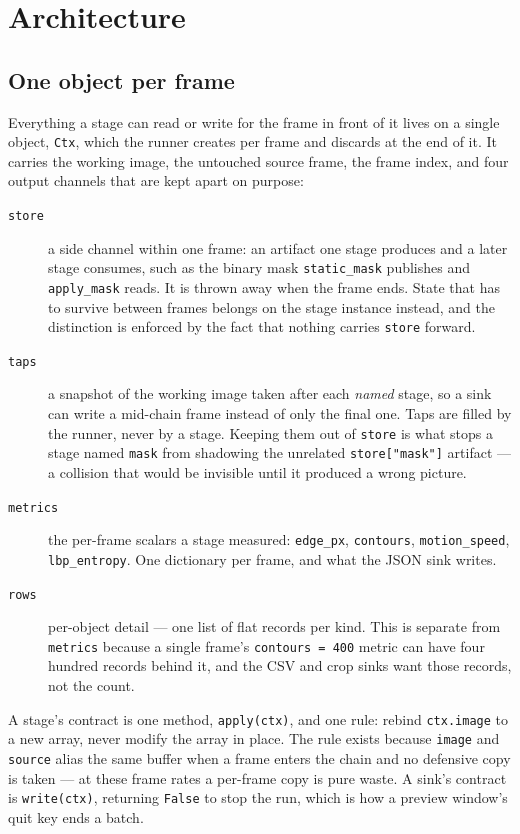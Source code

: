 \section{Architecture}
\label{sec:architecture}

\subsection{One object per frame}

Everything a stage can read or write for the frame in front of it lives on a
single object, \texttt{Ctx}, which the runner creates per frame and discards at
the end of it. It carries the working image, the untouched source frame, the
frame index, and four output channels that are kept apart on purpose:

\begin{description}
  \item[\texttt{store}] a side channel within one frame: an artifact one stage
    produces and a later stage consumes, such as the binary mask
    \texttt{static\_mask} publishes and \texttt{apply\_mask} reads. It is thrown
    away when the frame ends. State that has to survive between frames belongs on
    the stage instance instead, and the distinction is enforced by the fact that
    nothing carries \texttt{store} forward.
  \item[\texttt{taps}] a snapshot of the working image taken after each
    \emph{named} stage, so a sink can write a mid-chain frame instead of only the
    final one. Taps are filled by the runner, never by a stage. Keeping them out
    of \texttt{store} is what stops a stage named \texttt{mask} from shadowing the
    unrelated \texttt{store["mask"]} artifact --- a collision that would be
    invisible until it produced a wrong picture.
  \item[\texttt{metrics}] the per-frame scalars a stage measured:
    \texttt{edge\_px}, \texttt{contours}, \texttt{motion\_speed},
    \texttt{lbp\_entropy}. One dictionary per frame, and what the JSON sink
    writes.
  \item[\texttt{rows}] per-object detail --- one list of flat records per kind.
    This is separate from \texttt{metrics} because a single frame's
    \texttt{contours = 400} metric can have four hundred records behind it, and
    the CSV and crop sinks want those records, not the count.
\end{description}

A stage's contract is one method, \texttt{apply(ctx)}, and one rule: rebind
\texttt{ctx.image} to a new array, never modify the array in place. The rule
exists because \texttt{image} and \texttt{source} alias the same buffer when a
frame enters the chain and no defensive copy is taken --- at these frame rates a
per-frame copy is pure waste. A sink's contract is \texttt{write(ctx)}, returning
\texttt{False} to stop the run, which is how a preview window's quit key ends a
batch.

